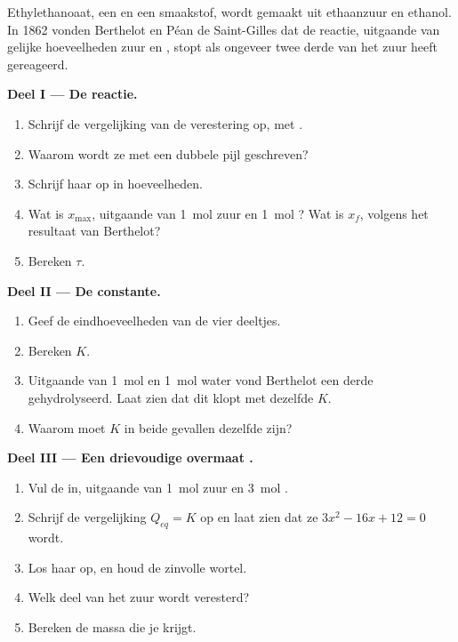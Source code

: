 \begin{problem}
\label{pb:g12:equilibrium:1}
Ethylethanoaat, een  en een smaakstof, wordt gemaakt uit
ethaanzuur en ethanol. In 1862 vonden Berthelot en Péan de Saint-Gilles
dat de reactie, uitgaande van gelijke hoeveelheden zuur en , stopt
als ongeveer twee derde van het zuur heeft gereageerd.

\medskip
\noindent\textbf{Deel I --- De reactie.}
\begin{enumerate}
  \item Schrijf de vergelijking van de verestering op, met .
  \item Waarom wordt ze met een dubbele pijl geschreven?
  \item Schrijf haar  op in hoeveelheden.
  \item Wat is $x_{\max}$, uitgaande van \qty{1}{mol} zuur en
        \qty{1}{mol} ? Wat is $x_f$, volgens het resultaat van
        Berthelot?
  \item Bereken $\tau$.
\end{enumerate}

\medskip
\noindent\textbf{Deel II --- De constante.}
\begin{enumerate}[resume]
  \item Geef de eindhoeveelheden van de vier deeltjes.
  \item Bereken $K$.
  \item Uitgaande van \qty{1}{mol}  en \qty{1}{mol} water vond
        Berthelot een derde gehydrolyseerd. Laat zien dat dit klopt met
        dezelfde $K$.
  \item Waarom moet $K$ in beide gevallen dezelfde zijn?
\end{enumerate}

\medskip
\noindent\textbf{Deel III --- Een drievoudige overmaat .}
\begin{enumerate}[resume]
  \item Vul de  in, uitgaande van \qty{1}{mol} zuur en
        \qty{3}{mol} .
  \item Schrijf de vergelijking $Q_{eq} = K$ op en laat zien dat ze
        $3x^2 - 16x + 12 = 0$ wordt.
  \item Los haar op, en houd de zinvolle wortel.
  \item Welk deel van het zuur wordt veresterd?
  \item Bereken de massa  die je krijgt.
\end{enumerate}


\end{problem}
